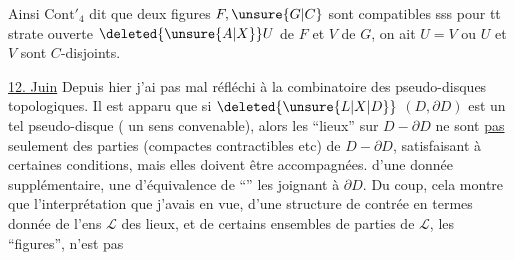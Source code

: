 
Ainsi $\mathrm{Cont}'_4$ dit que deux figures $F,\unsure{G|C}$ sont compatibles sss pour tt strate ouverte $\deleted{\unsure{A|X}}U$ de $F$ et $V$ de $G$,  on ait $U=V$ ou $U$ et $V$ sont $C$-disjoints.

\uline{12. Juin} Depuis hier j'ai pas mal réfléchi à la combinatoire des pseudo-disques topologiques. Il est apparu que si $\deleted{\unsure{L|X|D}}$ $(D,\partial D)$ est un tel pseudo-disque ( un sens convenable), alors les ``lieux'' sur $D-\partial D$ ne sont \uline{pas} seulement des parties (compactes contractibles etc) de $D-\partial D$, satisfaisant à certaines conditions, mais elles doivent être accompagnées. d'une donnée supplémentaire, une  d'équivalence de ``'' les joignant à $\partial D$. Du coup, cela montre que l'interprétation  que j'avais en vue, d'une structure de contrée en termes  donnée de l'ens $\mathcal L$ des lieux, et de certains ensembles de parties de $\mathcal L$, les ``figures'', n'est pas
